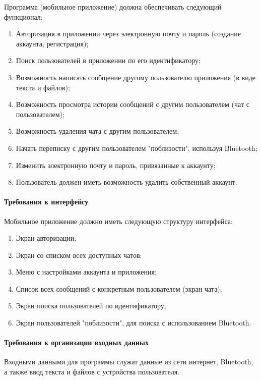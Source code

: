 \documentclass[testmethods]{espd}
\begin{document}
Программа (мобильное приложение) должна обеспечивать следующий функционал:

\begin{enumerate}
\item Авторизация в приложении через электронную почту и пароль (создание аккаунта, регистрация);
\item Поиск пользователей в приложении по его идентификатору;
\item Возможность написать сообщение другому пользователю приложения (в виде текста и файлов);
\item Возможность просмотра истории сообщений с другим пользователем (чат с пользователем);
\item Возможность удаления чата с другим пользователем;
\item Начать переписку с другим пользователем "поблизости", используя Bluetooth;
\item Изменить электронную почту и пароль, привязанные к аккаунту;
\item Пользователь должен иметь возможность удалить собственный аккаунт.
\end{enumerate}

\paragraph{Требования к интерфейсу}

Мобильное приложение должно иметь следующую структуру интерфейса:

\begin{enumerate}
\item Экран авторизации;
\item Экран со списком всех доступных чатов;
\item Меню с настройками аккаунта и приложения;
\item Список всех сообщений с конкретным пользователем (экран чата);
\item Экран поиска пользователей по идентификатору;
\item Экран пользователей "поблизости", для поиска с использованием Bluetooth.
\end{enumerate}

\paragraph{Требования к организации входных данных}
Входными данными для программы служат данные из сети интернет, Bluetooth, а также ввод текста и файлов с устройства пользователя.
\end{document}
